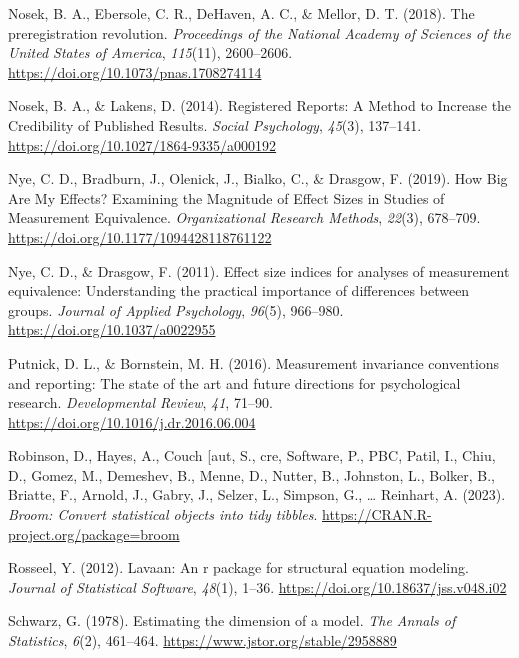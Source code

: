 \documentclass[
  man]{apa7}
\newlength{\cslhangindent}
\newenvironment{CSLReferences}[2] %
 {\begin{list}{}{%
  \setlength{\itemindent}{0pt}
  \setlength{\leftmargin}{0pt}
  \setlength{\parsep}{0pt}
  \ifodd #1
   \setlength{\leftmargin}{\cslhangindent}
   \setlength{\itemindent}{-1\cslhangindent}
  \fi
  \setlength{\itemsep}{#2\baselineskip}}}
 {\end{list}}
\begin{document}
\begin{CSLReferences}{1}{0}
Nosek, B. A., Ebersole, C. R., DeHaven, A. C., \& Mellor, D. T. (2018). The preregistration revolution. \emph{Proceedings of the National Academy of Sciences of the United States of America}, \emph{115}(11), 2600--2606. \url{https://doi.org/10.1073/pnas.1708274114}

Nosek, B. A., \& Lakens, D. (2014). Registered Reports: A Method to Increase the Credibility of Published Results. \emph{Social Psychology}, \emph{45}(3), 137--141. \url{https://doi.org/10.1027/1864-9335/a000192}

Nye, C. D., Bradburn, J., Olenick, J., Bialko, C., \& Drasgow, F. (2019). How Big Are My Effects? Examining the Magnitude of Effect Sizes in Studies of Measurement Equivalence. \emph{Organizational Research Methods}, \emph{22}(3), 678--709. \url{https://doi.org/10.1177/1094428118761122}

Nye, C. D., \& Drasgow, F. (2011). Effect size indices for analyses of measurement equivalence: Understanding the practical importance of differences between groups. \emph{Journal of Applied Psychology}, \emph{96}(5), 966--980. \url{https://doi.org/10.1037/a0022955}

Putnick, D. L., \& Bornstein, M. H. (2016). Measurement invariance conventions and reporting: The state of the art and future directions for psychological research. \emph{Developmental Review}, \emph{41}, 71--90. \url{https://doi.org/10.1016/j.dr.2016.06.004}

Robinson, D., Hayes, A., Couch {[}aut, S., cre, Software, P., PBC, Patil, I., Chiu, D., Gomez, M., Demeshev, B., Menne, D., Nutter, B., Johnston, L., Bolker, B., Briatte, F., Arnold, J., Gabry, J., Selzer, L., Simpson, G., \ldots{} Reinhart, A. (2023). \emph{Broom: Convert statistical objects into tidy tibbles}. \url{https://CRAN.R-project.org/package=broom}

Rosseel, Y. (2012). Lavaan: An r package for structural equation modeling. \emph{Journal of Statistical Software}, \emph{48}(1), 1--36. \url{https://doi.org/10.18637/jss.v048.i02}

Schwarz, G. (1978). Estimating the dimension of a model. \emph{The Annals of Statistics}, \emph{6}(2), 461--464. \url{https://www.jstor.org/stable/2958889}


\end{CSLReferences}
\end{document}
